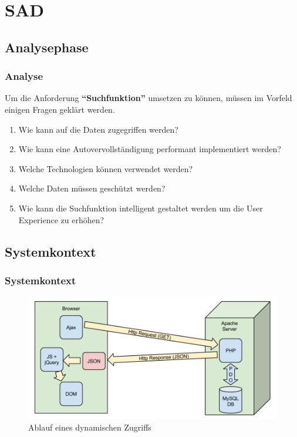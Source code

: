 \section{SAD}
\subsection{Analysephase}
\begin{frame} 
  \frametitle{Analyse} 
  Um die Anforderung \textbf{``Suchfunktion''} umsetzen zu können, müssen im Vorfeld einigen Fragen geklärt werden. 
   \begin{enumerate}
   \item Wie kann auf die Daten zugegriffen werden?
   \item Wie kann eine Autovervollständigung performant implementiert werden?
   \item Welche Technologien können verwendet werden?
   \item Welche Daten müssen geschützt werden?
   \item Wie kann die Suchfunktion intelligent gestaltet werden um die User 
   Experience zu erhöhen?
  \end{enumerate}
\end{frame}

\subsection{Systemkontext}
\begin{frame} 
  \frametitle{Systemkontext}
  \begin{figure}[htbp]
\centering
\includegraphics[width=1.0\textwidth]{./chapters/SAD_dynAccess.png}
\caption{Ablauf eines dynamischen Zugriffs}
\label{fig:SAD_dynAccess}
\end{figure}
\end{frame}

